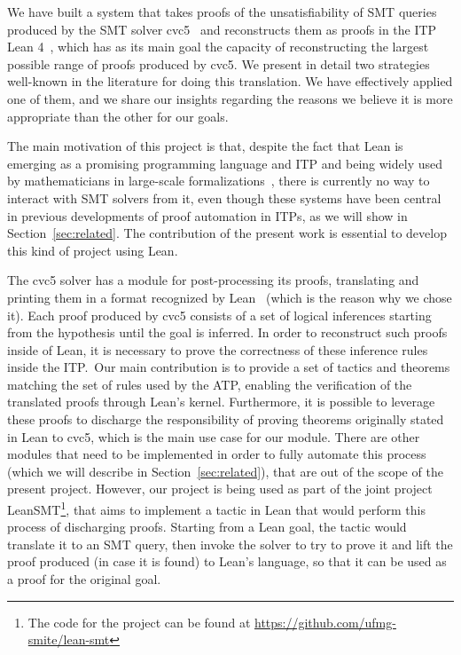 We have built a system that takes proofs of the unsatisfiability of
SMT queries produced by the SMT solver cvc5~\cite{cvc5} and
reconstructs them as proofs in the ITP Lean 4~\cite{lean},
which has as its main goal the capacity of reconstructing the largest possible
range of proofs produced by cvc5.
%
We present in detail two strategies well-known in the literature for doing this translation.
%
We have effectively applied one of them, and we share our insights
regarding the reasons we believe it is more appropriate than the other
for our goals.

The main motivation of this project is that, despite the fact that Lean is
emerging as a promising programming language and ITP and being
widely used by mathematicians in large-scale
formalizations~\cite{scholze, mathlib}, there is currently no way to
interact with SMT solvers from it, even though these systems have been
central in previous developments of proof automation in ITPs, as we will show in Section~\ref{sec:related}. The contribution of the present work
is essential to develop this kind of project using Lean.

The cvc5 solver has a module for post-processing its proofs,
translating and printing them in a format recognized by Lean~\cite{Barbosa2022} (which is the reason why we chose it).
Each proof produced by cvc5 consists of a set of logical inferences starting from the
hypothesis until the goal is inferred. In order to reconstruct such proofs inside of
Lean, it is necessary to prove the correctness of these inference rules inside the
ITP.\
Our main contribution is to provide a set of tactics and theorems matching the set
of rules used by the ATP, enabling the verification of the translated proofs through Lean's kernel.
Furthermore, it is possible to leverage these proofs to discharge the
responsibility of proving theorems originally stated in Lean to cvc5, which is
the main use case for our module. There are other modules that need to be implemented
in order to fully automate this process (which we will describe in Section~\ref{sec:related}), that are out of the scope of the present project.
However, our project is being used as part of the joint project
LeanSMT\footnote{The code for the project can be found at \url{https://github.com/ufmg-smite/lean-smt}}, that aims to implement a tactic in Lean
that would perform this process of discharging proofs. Starting from a Lean goal, the tactic would translate
it to an SMT query, then invoke the solver to try to prove it and lift the proof produced
(in case it is found) to Lean's language, so that it can be used as a proof for the original
goal.


